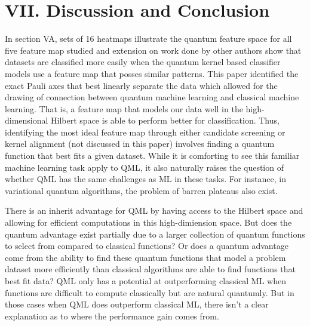 \documentclass[
	a4paper, %
	10pt, %
	unnumberedsections, %
	twoside, %
]{LTJournalArticle}
\begin{document}
\section{VII. Discussion and Conclusion}
In section VA, sets of 16 heatmaps illustrate the quantum feature space for all five feature map studied and extension on work done by other authors show that datasets are classified more easily 
when the quantum kernel based classifier models use a feature map that posses similar patterns. This paper identified the exact Pauli axes that best linearly separate the data which allowed for 
the drawing of connection between quantum machine learning and classical machine learning. That is, a feature map that models our data well in the high-dimensional Hilbert space is able to perform 
better for classification. Thus, identifying the most ideal feature map through either candidate screening or kernel alignment (not discussed in this paper) involves finding a quantum function 
that best fits a given dataset. While it is comforting to see this familiar machine learning task apply to QML, it also naturally raises the question of whether QML has the same challenges as 
ML in these tasks. For instance, in variational quantum algorithms, the problem of barren plateaus also exist.

There is an inherit advantage for QML by having access to the Hilbert space and allowing for efficient computations in this high-dimiension space. But does the quantum advantage exist partially 
due to a larger collection of quantum functions to select from compared to classical functions? Or does a quantum advantage come from the ability to find these quantum functions that model a 
problem dataset more efficiently than classical algorithms are able to find functions that best fit data? QML only has a potential at outperforming classical ML when functions are difficult to 
compute classically but are natural quantumly. But in those cases when QML does outperform classical ML, there isn't a clear explanation as to where the performance gain comes from. 
\end{document}
